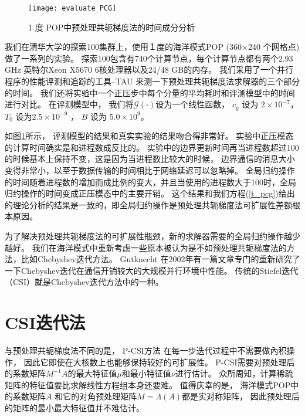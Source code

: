 \begin{figure}[ht]
\centering
\texttt{[image: evaluate\_PCG]}
\caption[] {1 度 POP中预处理共轭梯度法的时间成分分析\label{fig:pcg_ratio}}
\end{figure}

 
我们在清华大学的探索100集群上，使用１度的海洋模式POP (360$\times$240 个网格点)做了一系列的实验。 
探索100包含有740个计算节点，每个计算节点都有两个2.93 GHz 英特尔Xeon X5670 6核处理器以及24/48 GB的内存。 
我们采用了一个并行程序的性能评测和追踪的工具--TAU\cite{shende2006tau} 来测一下预处理共轭梯度法求解器的三个部分的时间。 
我们还将实验中一个正压步中每个分量的平均耗时和评测模型中的时间进行对比。 
在评测模型中， 我们将$\mathcal{G}(\cdot)$设为一个线性函数， $c_g$  设为 $2\times 10^{-7}$， $T_0$ 设为$2.5\times 10^{-9}$ ，  $B$  设为 $5.0\times 10^{9}$。 


如图\ref{fig:pcg_ratio}所示， 评测模型的结果和真实实验的结果吻合得非常好。 
实验中正压模态的计算时间确实是和进程数成反比的。 
实验中的边界更新时间再当进程数超过100的时候基本上保持不变，这是因为当进程数比较大的时候， 边界通信的消息大小变得非常小，以至于数据传输的时间相比于网络延迟可以忽略掉。 
全局归约操作的时间随着进程数的增加而成比例的变大，并且当使用的进程数大于100时，全局归约操作的时间变成正压模态中的主要开销。 
这个结果和我们方程(\ref{t_pcg})给出的理论分析的结果是一致的，即全局归约操作是预处理共轭梯度法可扩展性差额根本原因。 

为了解决预处理共轭梯度法的可扩展性瓶颈，新的求解器需要的全局归约操作越少越好。 
我们在海洋模式中重新考虑一些原本被认为是不如预处理共轭梯度法的方法，比如Chebyshev迭代方法。 
Gutknecht \cite{gutknecht2002chebyshev} 在2002年有一篇文章专门的重新研究了一下Chebyshev迭代在通信开销较大的大规模并行环境中性能。 
传统的Stiefel迭代（CSI）就是Chebyshev迭代方法中的一种。 


 
\section{CSI迭代法}
\label{solver:csi}
与预处理共轭梯度法不同的是， P-CSI方法 在每一步迭代过程中不需要做內积操作， 因此它即使在大核数上也能够保持较好的可扩展性。
P-CSI需要对预处理后的系数矩阵$M^{-1}A$的最大特征值$\mu$和最小特征值$\nu$进行估计。 
众所周知，计算稀疏矩阵的特征值要比求解线性方程组本身还要难。 
值得庆幸的是， 
海洋模式POP中的系数矩阵$A$ 和它的对角预处理矩阵$M = \Lambda(A)$都是实对称矩阵， 因此预处理后的矩阵的最小最大特征值并不难估计。 
 
